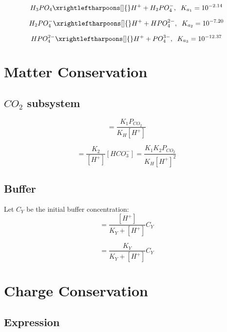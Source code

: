 \documentclass[aps,12pt]{revtex4}
\begin{document}
\begin{equation}
	H_3PO_4 \xrightleftharpoons[]{} H^+ + H_2PO_4^-, \;\; K_{a_1} = 10^{-2.14}
\end{equation}

\begin{equation}
	H_2PO_4^- \xrightleftharpoons[]{} H^+ + HPO_4^{2-}, \;\; K_{a_2} = 10^{-7.20}
\end{equation}


\begin{equation}
	HPO_4^{2-} \xrightleftharpoons[]{} H^+ +  PO_4^{3-}, \;\; K_{a_3} = 10^{-12.37}
\end{equation}


\section{Matter Conservation}

\subsection{$CO_2$ subsystem}
\begin{equation}
[HCO_3^-] = \dfrac{K_1 P_{CO_2}}{K_H [H^+] } 
\end{equation}

\begin{equation}
[CO_3^{2-}] = \dfrac{K_2}{[H^+] }  [HCO_3^-]  = \dfrac{K_1 K_2 P_{CO_2}}{K_H [H^+]^2 } 
\end{equation}

\subsection{Buffer}
Let $C_Y$ be the initial buffer concentration:
\begin{equation}
	[HY] = \dfrac{[H^+]}{K_Y + [H^+]} C_Y
\end{equation}

\begin{equation}
	[Y^-] = \dfrac{K_Y}{K_Y + [H^+]} C_Y
\end{equation}

\section{Charge Conservation}

\subsection{Expression}
\end{document}
